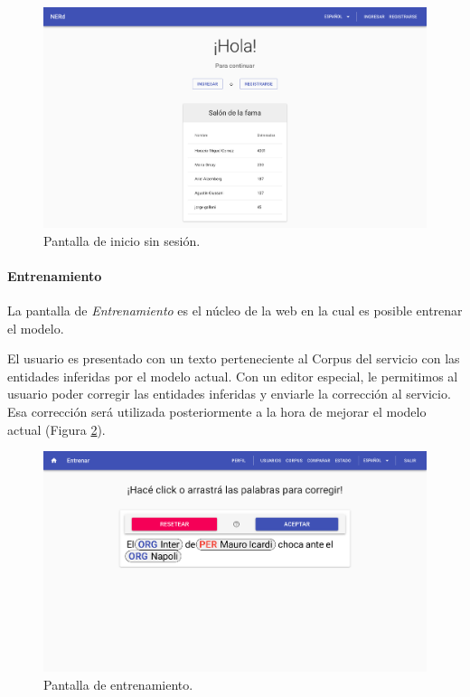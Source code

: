 \documentclass[12pt,a4paper,]{scrartcl}
\let\oldparagraph\paragraph
\renewcommand{\paragraph}[1]{\oldparagraph{#1}\mbox{}}
\begin{document}
\begin{figure}[H]

{\centering \includegraphics{assets/logic/home-anonymous.pdf} 

}

\caption{Pantalla de inicio sin sesión.}\label{fig:logic-home-anonymous}
\end{figure}

\hypertarget{entrenamiento}{%
\paragraph{Entrenamiento}\label{entrenamiento}}

La pantalla de \emph{Entrenamiento} es el núcleo de la web en la cual es posible entrenar el modelo.

El usuario es presentado con un texto perteneciente al Corpus del servicio con las entidades inferidas por el modelo actual. Con un editor especial, le permitimos al usuario poder corregir las entidades inferidas y enviarle la corrección al servicio. Esa corrección será utilizada posteriormente a la hora de mejorar el modelo actual (Figura \ref{fig:logic-train}).

\begin{figure}[H]

{\centering \includegraphics{assets/logic/train.pdf} 

}

\caption{Pantalla de entrenamiento.}\label{fig:logic-train}
\end{figure}
\end{document}
